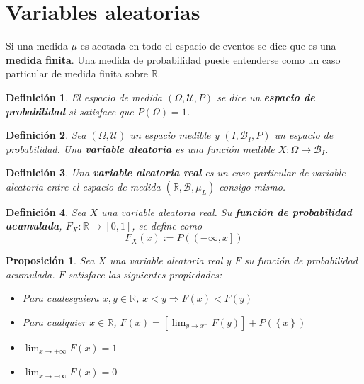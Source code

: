 \documentclass[12pt,letterpaper]{book}
\newtheorem{definicion}{Definición}[chapter]
\newtheorem{proposicion}[teorema]{Proposición}
\newcommand{\R}{\mathbb{R}}
\begin{document}

\section{Variables aleatorias}

Si una medida $\mu$ es acotada en todo el espacio de eventos se dice que es una \textbf{medida finita}.
%
Una medida de probabilidad puede entenderse como un caso particular de medida finita sobre $\R$.

\begin{definicion}
El espacio de medida $(\Omega,\mathcal{U},P)$ se dice un \textbf{espacio de probabilidad} si satisface que $P(\Omega) = 1$.
\end{definicion}

\begin{definicion}
\label{lazy4}
Sea $(\Omega,\mathcal{U})$ un espacio medible y $(I,\mathcal{B}_I,P)$ un espacio de probabilidad. Una \textbf{variable aleatoria} es una función medible $X: \Omega \rightarrow \mathcal{B}_I$.
\end{definicion}

\begin{definicion}
Una \textbf{variable aleatoria real} es un caso particular de variable aleatoria entre el espacio de medida $(\R,\mathcal{B},\mu_L)$ consigo mismo.
\end{definicion}

\begin{definicion}%
Sea $X$ una variable aleatoria real. Su \textbf{función de probabilidad acumulada}, $F_X : \R \rightarrow [0,1]$, se define como
\begin{equation*}
F_X (x) := P\left( \left(-\infty,x \right] \right)
\end{equation*}
\end{definicion}

\begin{proposicion}
Sea $X$ una variable aleatoria real y $F$ su función de probabilidad acumulada. $F$ satisface las siguientes propiedades:
\begin{itemize}
\item Para cualesquiera $x,y\in \R$, $x < y \Rightarrow F(x) < F(y)$
\item Para cualquier $x\in\R$, $F(x) = \left[\lim_{y\rightarrow x^{-}} F(y)\right] + P\left(\left\{x\right\}\right)$
\item $\lim_{x\rightarrow +\infty} F(x) = 1$
\item $\lim_{x\rightarrow -\infty} F(x) = 0$
\end{itemize}
\end{proposicion}
\end{document}
